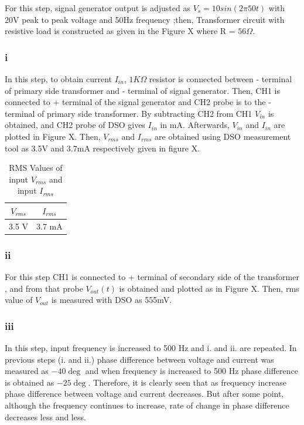 \documentclass[letterpaper,12pt]{article}
\begin{document}
For this step, signal generator output is adjusted as \(V_s = 10sin(2\pi50t)\) with 20V peak to peak voltage and 50Hz frequency ;then, Transformer circuit with resistive load is constructed as given in the Figure X where R = \(56\Omega \).  
\subsubsection{i}
In this step, to obtain current \(I_{in}\), \(1K\Omega \) resistor is connected between - terminal of primary side transformer and - terminal of signal generator. Then, CH1 is connected to + terminal of the signal generator and CH2 probe is to the - terminal of primary side transformer. By subtracting CH2 from CH1 \(V_{in}\) is obtained, and CH2 probe of DSO gives \(I_{in}\) in mA. Afterwards, \(V_{in}\) and \(I_{in}\) are plotted in Figure X. Then, \(V_{rms}\) and \(I_{rms}\) are obtained using DSO measurement tool as 3.5V and 3.7mA respectively given in figure X. 
\begin{table}[H]
    \begin{center}
        \caption{RMS Values of input \(V_{rms}\) and input \(I_{rms}\)}
        \vspace{2mm}
        \begin{tabular}{||c | c ||} 
            \hline
            \(V_{rms}\) & \(I_{rms}\) \\ [0.5ex] 
            \hline\hline
            3.5 V & 3.7 mA    \\
            \hline
        \end{tabular}
    \end{center}
\end{table}

\subsubsection{ii}
For this step CH1 is connected to + terminal of secondary side of the transformer , and from that probe \(V_{out}(t)\) is obtained and plotted as in Figure X. Then, rms value of \(V_{out}\) is measured with DSO as 555mV.
\subsubsection{iii}
In this step, input frequency is increased to 500 Hz and i. and ii. are repeated. In previous steps (i. and ii.) phase difference between voltage and current was measured as \(-40\deg \) and when frequency is increased to 500 Hz phase difference is obtained as \(-25\deg\). Therefore, it is clearly seen that as frequency increase phase difference between voltage and current decreases. But after some point, although the frequency continues to increase, rate of change in phase difference decreases less and less.
%
\end{document}
